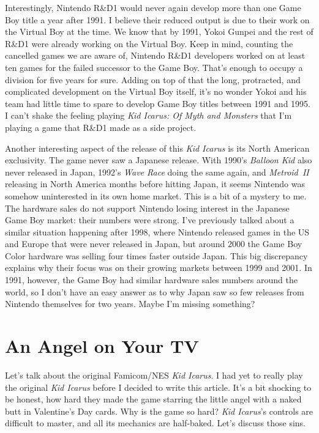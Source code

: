 \documentclass{book}
\begin{document}
Interestingly, Nintendo R\&D1 would never again develop more than one Game Boy title a year after 1991. I believe their reduced output is due to their work on the Virtual Boy at the time. We know that by 1991, Yokoi Gunpei and the rest of R\&D1 were already working on the Virtual Boy. Keep in mind, counting the cancelled games we are aware of, Nintendo R\&D1 developers worked on at least ten games for the failed successor to the Game Boy. That’s enough to occupy a division for five years for sure. Adding on top of that the long, protracted, and complicated development on the Virtual Boy itself, it’s no wonder Yokoi and his team had little time to spare to develop Game Boy titles between 1991 and 1995. I can’t shake the feeling playing \emph{Kid Icarus: Of Myth and Monsters} that I’m playing a game that R\&D1 made as a side project.

Another interesting aspect of the release of this \emph{Kid Icarus} is its North American exclusivity. The game never saw a Japanese release. With 1990’s \emph{Balloon Kid} also never released in Japan, 1992’s \emph{Wave Race} doing the same again, and \emph{Metroid II} releasing in North America months before hitting Japan, it seems Nintendo was somehow uninterested in its own home market. This is a bit of a mystery to me. The hardware sales do not support Nintendo losing interest in the Japanese Game Boy market: their numbers were strong. I’ve previously talked about a similar situation happening after 1998, where Nintendo released games in the US and Europe that were never released in Japan, but around 2000 the Game Boy Color hardware was selling four times faster outside Japan. This big discrepancy explains why their focus was on their growing markets between 1999 and 2001. In 1991, however, the Game Boy had similar hardware sales numbers around the world, so I don’t have an easy answer as to why Japan saw so few releases from Nintendo themselves for two years. Maybe I’m missing something?

\FloatBarrier\needspace{5pt}\section*{An Angel on Your TV}\nopagebreak[4]

Let’s talk about the original Famicom/NES \emph{Kid Icarus}. I had yet to really play the original \emph{Kid Icarus} before I decided to write this article. It’s a bit shocking to be honest, how hard they made the game starring the little angel with a naked butt in Valentine’s Day cards. Why is the game so hard? \emph{Kid Icarus}’s controls are difficult to master, and all its mechanics are half-baked. Let’s discuss those sins.
\end{document}
